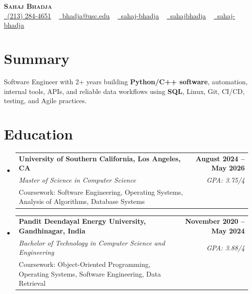\documentclass[letterpaper,10pt]{article}
\makeatletter
\newcommand{\sectionGap}{\vspace{-8pt}}
\newcommand{\resumeEduSubheading}[5]{\vspace{-1pt}\item\begin{tabular*}{1.0\textwidth}[t]{l@{\extracolsep{\fill}}r}\textbf{#1} & \textbf{\small #2} \\\textit{\small #3} & \textit{\small #4} \\\small #5 & \\\end{tabular*}\vspace{-4pt}}
\newcommand{\resumeSubHeadingListStart}{\begin{itemize}[leftmargin=0.0in, label={}]}
\newcommand{\resumeSubHeadingListEnd}{\end{itemize}}
\makeatother
\begin{document}
\begin{center}
{\Huge \scshape \textbf{Sahaj Bhadja}} \\ \vspace{1pt}
\small \href{tel:2132844651}{\faPhone\ \underline{(213) 284-4651}} ~ \href{mailto:bhadja@usc.edu}{\raisebox{-0.2\height}\faEnvelope\ \underline{bhadja@usc.edu}} ~
\href{https://www.linkedin.com/in/sahaj-bhadja/}{\raisebox{-0.2\height}\faLinkedin\ \underline{sahaj-bhadja}} ~ \href{https://github.com/SAHAJ-BHADJA}{\raisebox{-0.2\height}\faGithub\ \underline{sahajbhadja}} ~
\href{https://sahaj-bhadja.vercel.app/}{\raisebox{-0.2\height}\faGlobe\ \underline{sahaj-bhadja}}
\end{center}
\vspace{-16pt}
\section{Summary}
\begin{itemize}[leftmargin=0.15in, label={}]
\small{\item{Software Engineer with 2+ years building \textbf{Python/C++ software}, automation, internal tools, APIs, and reliable data workflows using \textbf{SQL}, Linux, Git, CI/CD, testing, and Agile practices.}}
\end{itemize}
\sectionGap
\section{Education}
\resumeSubHeadingListStart
\resumeEduSubheading{University of Southern California, Los Angeles, CA}{August 2024 -- May 2026}{Master of Science in Computer Science}{GPA: 3.75/4}{Coursework: Software Engineering, Operating Systems, Analysis of Algorithms, Database Systems}
\resumeEduSubheading{Pandit Deendayal Energy University, Gandhinagar, India}{November 2020 -- May 2024}{Bachelor of Technology in Computer Science and Engineering}{GPA: 3.88/4}{Coursework: Object-Oriented Programming, Operating Systems, Software Engineering, Data Retrieval}
\resumeSubHeadingListEnd
\sectionGap
\end{document}
